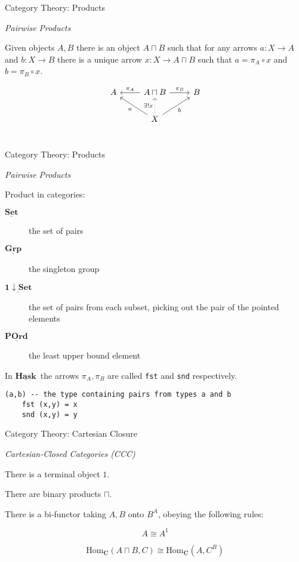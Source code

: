 \documentclass[10pt]{beamer}
\newcommand{\Cat}[1]{\ensuremath{\underline{\mathbf{#1}}}}
\newcommand{\Hom}[3]{\ensuremath{\mathrm{Hom}_{\Cat{#1}}(#2,#3)}}
\newcommand{\Com}[3]{#3^{#2}}
\newcommand{\eqnlabel}[1]{\label{eq:#1}}
\theoremstyle{definition}
\theoremstyle{remark}
\numberwithin{equation}{section}
\begin{document}
\begin{frame}[fragile]{Category Theory: Products}

  \emph{Pairwise Products}

  Given objects $A,B$ there is an object $A\sqcap B$ such that for any arrows $a : X \rightarrow A$ and $b : X \rightarrow B$ there is a unique arrow $x : X \rightarrow A\sqcap B$ such that $a = \pi_A \circ x$ and $b = \pi_B \circ x$.

  \[
  \begin{tikzcd}
    A & A\sqcap B \arrow[swap]{l}{\pi_{A}} \arrow{r}{\pi_{B}} & B \\
    & X \arrow[dotted]{u}{\exists! x} \arrow{ul}{a} \arrow[swap]{ur}{b} & \\
  \end{tikzcd}
  \]


\end{frame}

\begin{frame}[fragile]{Category Theory: Products}

  \emph{Pairwise Products}

  Product in categories:
  \begin{description}
    \item[\Cat{Set}] the set of pairs
    \item[\Cat{Grp}] the singleton group
    \item[\Cat{1\downarrow Set}] the set of pairs from each subset, picking out the pair of the pointed elements
    \item[\Cat{POrd}] the least upper bound element
  \end{description}

  In \Cat{Hask}\ the arrows $\pi_A,\pi_B$ are called \lstinline[columns=fixed]{fst} and \lstinline[columns=fixed]{snd} respectively.

  \begin{lstlisting}[frame=single]
    (a,b) -- the type containing pairs from types a and b
    fst (x,y) = x
    snd (x,y) = y
  \end{lstlisting}

\end{frame}

\begin{frame}[fragile]{Category Theory: Cartesian Closure}

  \emph{Cartesian-Closed Categories (CCC)}

  There is a terminal object $1$.

  There are binary products $\sqcap$.

  There is a bi-functor taking $A,B$ onto $\Com{C}{A}{B}$, obeying the following rules:
  
  \[
  A \cong \Com{C}{1}{A}
  \]
  
  \begin{equation}
  \Hom{C}{A\sqcap B}{C} \cong \Hom{C}{A}{\Com{C}{B}{C}} \eqnlabel{exp1}
  \end{equation}
\end{frame}
\end{document}
